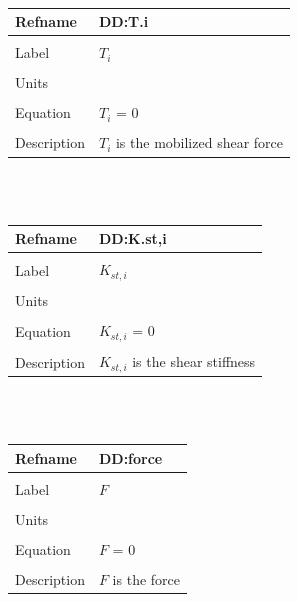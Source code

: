 \documentclass[12pt]{article}
\begin{document}
~\newline
\noindent \begin{minipage}{\textwidth}
\begin{tabular}{p{} p{}}
\toprule \textbf{Refname} & \textbf{DD:T.i}
\label{DD:T.i}
\\ \midrule \\
Label & $T_{i}$
\\ \midrule \\
Units & 
\\ \midrule \\
Equation & $T_{i}$ = $0$
\\ \midrule \\
Description & $T_{i}$ is the mobilized shear force
\\ \bottomrule \end{tabular}
\end{minipage}\\
~\newline
\noindent \begin{minipage}{\textwidth}
\begin{tabular}{p{} p{}}
\toprule \textbf{Refname} & \textbf{DD:K.st,i}
\label{DD:K.st,i}
\\ \midrule \\
Label & $K_{st,i}$
\\ \midrule \\
Units & 
\\ \midrule \\
Equation & $K_{st,i}$ = $0$
\\ \midrule \\
Description & $K_{st,i}$ is the shear stiffness
\\ \bottomrule \end{tabular}
\end{minipage}\\
~\newline
\noindent \begin{minipage}{\textwidth}
\begin{tabular}{p{} p{}}
\toprule \textbf{Refname} & \textbf{DD:force}
\label{DD:force}
\\ \midrule \\
Label & $F$
\\ \midrule \\
Units & 
\\ \midrule \\
Equation & $F$ = $0$
\\ \midrule \\
Description & $F$ is the force
\\ \bottomrule \end{tabular}
\end{minipage}\\
\end{document}
